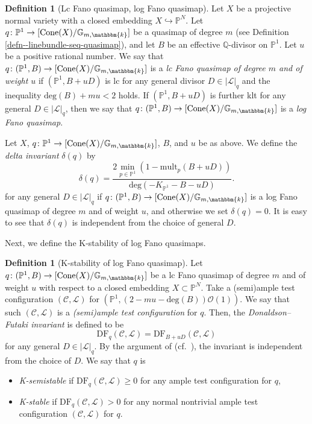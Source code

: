 \documentclass[12pt,twoside]{amsart}
\theoremstyle{definition}
\newtheorem{defn}[thm]{Definition}
\begin{document}
\begin{defn}[Lc Fano quasimap, log Fano quasimap]\label{defn--lcFanoquasimap}
Let $X$ be a projective normal variety with a closed embedding $X \hookrightarrow \mathbb{P}^N$. 
   Let $q\colon\mathbb{P}^1\to [\mathrm{Cone}(X)/\mathbb{G}_{m, \mathbbm{k}}]$ be a quasimap of degree $m$ (see Definition \ref{defn--linebundle-seq-quasimap}), and let $B$ be an effective $\mathbb{Q}$-divisor on $\mathbb{P}^1$. 
    Let $u$ be a positive rational number.
We say that 
$q\colon(\mathbb{P}^1,B)\to [\mathrm{Cone}(X)/\mathbb{G}_{m, \mathbbm{k}}]$ is a {\it lc Fano quasimap of degree $m$ and of weight $u$} if $(\mathbb{P}^1,B+uD)$ is lc for any general divisor $D\in|\mathscr{L}|_q$ and the inequality $\mathrm{deg}(B)+mu<2$ holds.
If $(\mathbb{P}^1,B+uD)$ is further klt for any general $D\in|\mathscr{L}|_q$, then we say that $q\colon(\mathbb{P}^1,B)\to [\mathrm{Cone}(X)/\mathbb{G}_{m, \mathbbm{k}}]$ is a {\it log Fano quasimap}. 

Let $X$, $q\colon\mathbb{P}^1\to [\mathrm{Cone}(X)/\mathbb{G}_{m, \mathbbm{k}}]$, $B$, and $u$ be as above.
We define the {\it delta invariant} $\delta(q)$ by
  \begin{equation*}
    \delta(q)=\frac{2\min_{p\in\mathbb{P}^1}(1-\mathrm{mult}_p(B+uD))}{\mathrm{deg}(-K_{\mathbb{P}^1}-B-uD)}.\label{eq--delta--quasi--map}
\end{equation*}
    for any general $D\in|\mathscr{L}|_q$ if $q\colon(\mathbb{P}^1,B)\to [\mathrm{Cone}(X)/\mathbb{G}_{m, \mathbbm{k}}]$ is a log Fano quasimap of degree $m$ and of weight $u$, and otherwise we set $\delta(q)=0$. It is easy to see that $\delta(q)$ is independent from the choice of  general $D$.    
\end{defn}


Next, we define the K-stability of log Fano quasimaps.

\begin{defn}[K-stability of log Fano quasimap]\label{de--kst--qmaps}
    Let $q\colon(\mathbb{P}^1,B)\to [\mathrm{Cone}(X)/\mathbb{G}_{m, \mathbbm{k}}]$ be a lc Fano quasimap of degree $m$ and of weight $u$ with respect to a closed embedding $X\subset\mathbb{P}^N$.
Take a (semi)ample test configuration $(\mathcal{C},\mathcal{L})$ for $(\mathbb{P}^1,(2-mu-\mathrm{deg}(B))\mathcal{O}(1))$. 
We say that such $(\mathcal{C},\mathcal{L})$ is a {\it (semi)ample test configuration} for $q$.
    Then, the {\it Donaldson--Futaki invariant} is defined to be
    $$\mathrm{DF}_q(\mathcal{C},\mathcal{L})=\mathrm{DF}_{B+uD}(\mathcal{C},\mathcal{L})$$
    for any  general $D\in|\mathscr{L}|_q$. 
    By the argument of \cite[Proposition 3.8]{BLZ} (cf.~\cite{Hat}), the invariant is independent from the choice of $D$. 
We say that $q$ is
\begin{itemize}
    \item {\it K-semistable} if $\mathrm{DF}_q(\mathcal{C},\mathcal{L})\ge0$ for any ample test configuration for $q$,
    \item {\it K-stable}
 if $\mathrm{DF}_q(\mathcal{C},\mathcal{L})>0$ for any normal nontrivial ample test configuration $(\mathcal{C},\mathcal{L})$ for $q$.
\end{itemize}
\end{defn}
\end{document}
